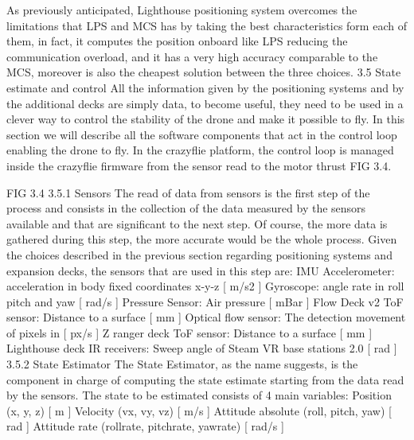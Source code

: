 As previously anticipated, Lighthouse positioning system overcomes the limitations that LPS and MCS has by taking the best characteristics form each of them, in fact, it computes the position onboard like LPS reducing the communication overload, and it has a very high accuracy comparable to the MCS, moreover is also the cheapest solution between the three choices.
3.5 State estimate and control
All the information given by the positioning systems and by the additional decks are simply data, to become useful, they need to be used in a clever way to control the stability of the drone and make it possible to fly. In this section we will describe all the software components that act in the control loop enabling the drone to fly.
In the crazyflie platform, the control loop is managed inside the crazyflie firmware from the sensor read to the motor thrust {FIG 3.4}.

FIG 3.4
3.5.1 Sensors
The read of data from sensors is the first step of the process and consists in the collection of the data measured by the sensors available and that are significant to the next step. Of course, the more data is gathered during this step, the more accurate would be the whole process. Given the choices described in the previous section regarding positioning systems and expansion decks, the sensors that are used in this step are:
IMU
Accelerometer: acceleration in body fixed coordinates x-y-z [ m/s2 ]
Gyroscope: angle rate in roll pitch and yaw [ rad/s ]
Pressure Sensor: Air pressure [ mBar ]
Flow Deck v2
ToF sensor: Distance to a surface [ mm ]
Optical flow sensor: The detection movement of pixels in [ px/s ]
Z ranger deck
ToF sensor: Distance to a surface [ mm ]
Lighthouse deck
IR receivers: Sweep angle of Steam VR base stations 2.0 [ rad ]
3.5.2 State Estimator
The State Estimator, as the name suggests, is the component in charge of computing the state estimate starting from the data read by the sensors. The state to be estimated consists of 4 main variables:
Position (x, y, z) [ m ]
Velocity (vx, vy, vz) [ m/s ]
Attitude absolute (roll, pitch, yaw) [ rad ]
Attitude rate (rollrate, pitchrate, yawrate) [ rad/s ]

